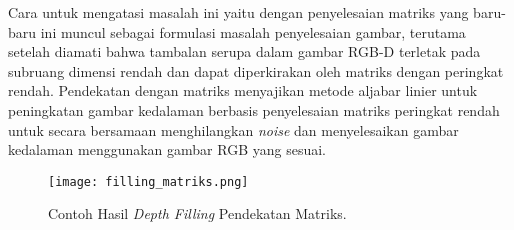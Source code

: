 Cara untuk mengatasi masalah ini yaitu dengan penyelesaian matriks yang baru-baru ini muncul sebagai formulasi masalah penyelesaian gambar, terutama setelah diamati bahwa tambalan serupa dalam gambar RGB-D terletak pada subruang dimensi rendah dan dapat diperkirakan oleh matriks dengan peringkat rendah\cite{b11}. Pendekatan dengan matriks menyajikan metode aljabar linier untuk peningkatan gambar kedalaman berbasis penyelesaian matriks peringkat rendah untuk secara bersamaan menghilangkan \textit{noise} dan menyelesaikan gambar kedalaman menggunakan gambar RGB yang sesuai. 

\begin{figure}[H]
    \centering
    \texttt{[image: filling\_matriks.png]}
    \caption{Contoh Hasil \textit{Depth Filling} Pendekatan Matriks\cite{b9}.}
    \label{fig:Ch02_filling_matriks}
\end{figure}

